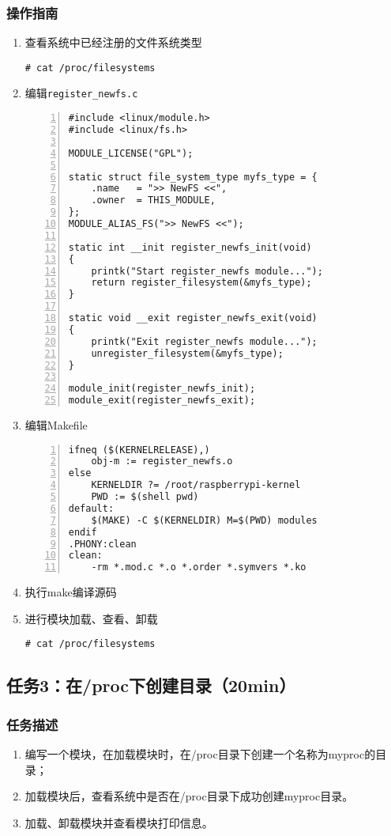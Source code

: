 \documentclass{article}
\begin{document}
\subsubsection{操作指南}
\begin{enumerate}
    \item 查看系统中已经注册的文件系统类型
\begin{lstlisting}
# cat /proc/filesystems
\end{lstlisting}
    \item 编辑\verb|register_newfs.c|
\begin{lstlisting}[numbers=left]
#include <linux/module.h>
#include <linux/fs.h>

MODULE_LICENSE("GPL");

static struct file_system_type myfs_type = {
	.name	= ">> NewFS <<",
	.owner	= THIS_MODULE,
};
MODULE_ALIAS_FS(">> NewFS <<");

static int __init register_newfs_init(void)
{
	printk("Start register_newfs module...");
	return register_filesystem(&myfs_type);
}

static void __exit register_newfs_exit(void)
{
	printk("Exit register_newfs module...");
	unregister_filesystem(&myfs_type);
}

module_init(register_newfs_init);
module_exit(register_newfs_exit);

\end{lstlisting}
    \item 编辑Makefile
\begin{lstlisting}[numbers=left]
ifneq ($(KERNELRELEASE),)
	obj-m := register_newfs.o
else
	KERNELDIR ?= /root/raspberrypi-kernel
	PWD := $(shell pwd)
default:
	$(MAKE) -C $(KERNELDIR) M=$(PWD) modules
endif
.PHONY:clean
clean:
	-rm *.mod.c *.o *.order *.symvers *.ko

\end{lstlisting}
    \item 执行make编译源码
    \item 进行模块加载、查看、卸载
    \begin{lstlisting}
# cat /proc/filesystems
\end{lstlisting}
\end{enumerate}

\newpage
\subsection{任务3：在/proc下创建目录（20min）}

\subsubsection{任务描述}
\begin{enumerate}
    \item 编写一个模块，在加载模块时，在/proc目录下创建一个名称为myproc的目录；
    \item 加载模块后，查看系统中是否在/proc目录下成功创建myproc目录。
    \item 加载、卸载模块并查看模块打印信息。

\end{enumerate}
\end{document}
